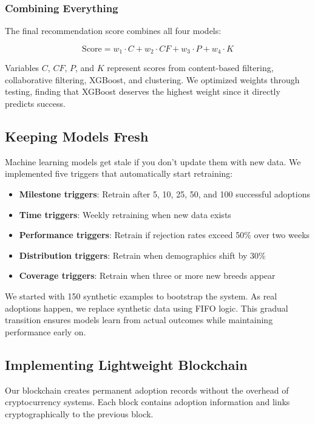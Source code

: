 \documentclass[conference]{IEEEtran}
\begin{document}
\subsubsection{Combining Everything}
The final recommendation score combines all four models:

\begin{equation}
\text{Score} = w_1 \cdot C + w_2 \cdot CF + w_3 \cdot P + w_4 \cdot K
\end{equation}

Variables $C$, $CF$, $P$, and $K$ represent scores from content-based filtering, collaborative filtering, XGBoost, and clustering. We optimized weights through testing, finding that XGBoost deserves the highest weight since it directly predicts success.

\subsection{Keeping Models Fresh}

Machine learning models get stale if you don't update them with new data. We implemented five triggers that automatically start retraining:

\begin{itemize}
\item \textbf{Milestone triggers}: Retrain after 5, 10, 25, 50, and 100 successful adoptions
\item \textbf{Time triggers}: Weekly retraining when new data exists
\item \textbf{Performance triggers}: Retrain if rejection rates exceed 50\% over two weeks
\item \textbf{Distribution triggers}: Retrain when demographics shift by 30\%
\item \textbf{Coverage triggers}: Retrain when three or more new breeds appear
\end{itemize}

We started with 150 synthetic examples to bootstrap the system. As real adoptions happen, we replace synthetic data using FIFO logic. This gradual transition ensures models learn from actual outcomes while maintaining performance early on.

\subsection{Implementing Lightweight Blockchain}

Our blockchain creates permanent adoption records without the overhead of cryptocurrency systems. Each block contains adoption information and links cryptographically to the previous block.
\end{document}
